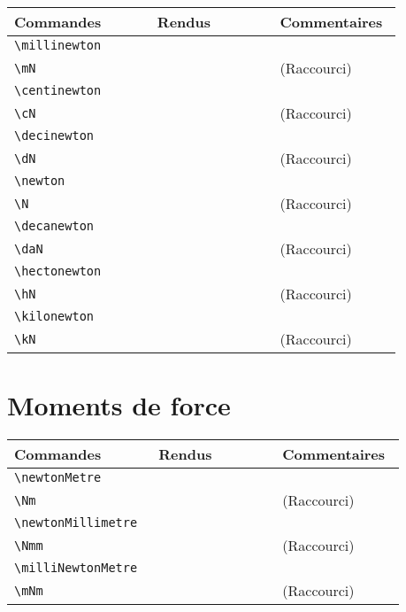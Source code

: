 \documentclass[a4paper,12pt]{article}
\newcommand{\rac}{({\color{red}Raccourci})}
\begin{document}
	
	\noindent
	\begin{tabular}{|p{0.35\linewidth}|p{0.3\linewidth}|p{0.3\linewidth}|}
		\hline
 			\textbf{Commandes}&\textbf{Rendus}&\textbf{Commentaires}
 		\\\hline\hline
 			\verb!\millinewton!	& 	\millinewton	&	\\
 		\hline
			\verb!\mN!		& 	\mN		&	\rac\\
		\hline
			\verb!\centinewton!	& 	\centinewton	&	\\
		\hline
			\verb!\cN!		& 	\cN		&	\rac\\
		\hline
			\verb!\decinewton!	& 	\decinewton	&	\\
		\hline
			\verb!\dN!		& 	\dN		&	\rac\\
		\hline
			\verb!\newton!		& 	\newton		&	\\
		\hline
			\verb!\N!		& 	\N		&	\rac\\
		\hline
			\verb!\decanewton!	& 	\decanewton	&	\\
		\hline
			\verb!\daN!		& 	\daN		&	\rac\\
		\hline
			\verb!\hectonewton!	& 	\hectonewton	&	\\
		\hline
			\verb!\hN!		& 	\hN		&	\rac\\
		\hline
			\verb!\kilonewton!	& 	\kilonewton	&	\\
		\hline
			\verb!\kN!		& 	\kN		&	\rac\\
		\hline
	\end{tabular}

	
	
	\section{Moments de force}
	
	
	\noindent
	\begin{tabular}{|p{0.35\linewidth}|p{0.3\linewidth}|p{0.3\linewidth}|}
		\hline
 			\textbf{Commandes}&\textbf{Rendus}&\textbf{Commentaires}
 		\\\hline\hline
			\verb!\newtonMetre!	& 	\newtonMetre	&	\\
		\hline
			\verb!\Nm!		& 	\Nm		&	\rac\\
		\hline
			\verb!\newtonMillimetre!& 	\newtonMillimetre	&	\\
		\hline
			\verb!\Nmm!		& 	\Nmm		&	\rac\\
		\hline
			\verb!\milliNewtonMetre!& 	\milliNewtonMetre		&	\\
		\hline
			\verb!\mNm!		& 	\mNm		&	\rac\\
		\hline
	\end{tabular}
		
\end{document}
